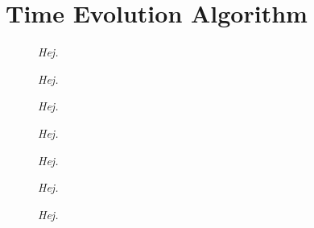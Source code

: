 \chapter{Time Evolution Algorithm}

\begin{figure}[h!]
	\centering
	
	\caption{\textit{Hej.}}
	\label{fig:ModifiedTrotter}
\end{figure}

\begin{figure}[h!]
	\centering
	
	\caption{\textit{Hej.}}
\end{figure}
	
\begin{figure}[h!]
	\centering
	
	\caption{\textit{Hej.}}
\end{figure}
	
\begin{figure}[h!]
	\centering
	
	\caption{\textit{Hej.}}
\end{figure}
	
\begin{figure}[h!]
	\centering
	
	\caption{\textit{Hej.}}
\end{figure}
	
\begin{figure}[h!]
	\centering
	
	\caption{\textit{Hej.}}
\end{figure}
	
\begin{figure}[h!]
	\centering
	
	\caption{\textit{Hej.}}
\end{figure}
	